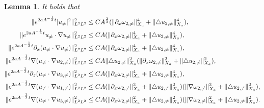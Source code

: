\documentclass[12pt, reqno]{amsart}
\newtheorem{lemma}{Lemma}[section]
\numberwithin{equation}{section}
\begin{document}
	
	\begin{lemma}\label{lemma_neq1}
		It holds that 
		\begin{equation}\label{eq:nonlinear-neq0}
			\begin{aligned}
				\|{\rm e}^{2aA^{-\frac{1}{3}}t}|u_{\neq}|^2\|_{L^2L^2}^2&\leq
				CA^{\frac{2}{3}}(\|\partial_x\omega_{2,\neq}\|^4_{X_a}+\|\triangle u_{2,\neq}\|^4_{X_a}),\\
				\|{\rm e}^{2aA^{-\frac{1}{3}}t}u_{\neq}\cdot\nabla u_{\neq}\|_{L^2L^2}^2&\leq
				CA(\|\partial_x\omega_{2,\neq}\|^4_{X_a}+\|\triangle u_{2,\neq}\|^4_{X_a}),\\
				\|{\rm e}^{2aA^{-\frac{1}{3}}t}\partial_x(u_{\neq}\cdot\nabla u_{\neq})\|^2_{L^2L^2}
				&\leq CA(\|\partial_x\omega_{2,\neq}\|^4_{X_a}
				+\|\triangle u_{2,\neq}\|^4_{X_a}),\\		
				\|{\rm e}^{2aA^{-\frac{1}{3}}t}\nabla(u_{\neq}\cdot\nabla u_{2,\neq})\|^2_{L^2L^2}
				&\leq CA\|\triangle u_{2,\neq}\|^2_{X_a}(\|\partial_x\omega_{2,\neq}\|^2_{X_a}
				+\|\triangle u_{2,\neq}\|^2_{X_a}),\\	
				\|{\rm e}^{2aA^{-\frac{1}{3}}t}\partial_z(u_{\neq}\cdot\nabla u_{3,\neq})\|_{L^2L^2}^2	
				&\leq CA(\|\partial_x\omega_{2,\neq}\|^4_{X_a}
				+\|\triangle u_{2,\neq}\|^4_{X_a}), \\		
				\|{\rm e}^{2aA^{-\frac{1}{3}}t}\nabla(u_{\neq}\cdot\nabla u_{1,\neq})\|^2_{L^2L^2}
				&\leq  CA(\|\partial_x\omega_{2,\neq}\|^2_{X_a}
				+\|\triangle u_{2,\neq}\|^2_{X_a})
				(\|\nabla\omega_{2,\neq}\|^2_{X_a}
				+\|\triangle u_{2,\neq}\|^2_{X_a}),\\
				\|{\rm e}^{2aA^{-\frac{1}{3}}t}\nabla(u_{\neq}\cdot\nabla u_{3,\neq})\|^2_{L^2L^2}
				&\leq  CA(\|\partial_x\omega_{2,\neq}\|^2_{X_a}
				+\|\triangle u_{2,\neq}\|^2_{X_a})
				(\|\nabla\omega_{2,\neq}\|^2_{X_a}
				+\|\triangle u_{2,\neq}\|^2_{X_a}).
			\end{aligned}
		\end{equation}
	\end{lemma}
\end{document}
